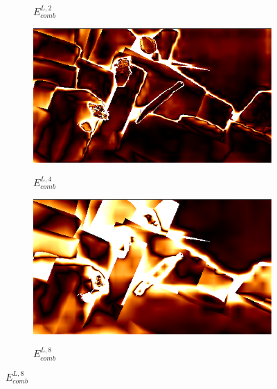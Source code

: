 \documentclass[10pt]{article}
\begin{document}
\begin{figure}[t]
{\begin{subfigure}[b]{0.28\textwidth}
        \vspace{-15pt}      
        \caption{$E_{comb}^{L,2}$}
    \end{subfigure} 
    \hspace{0.001cm} 
    \begin{subfigure}[b]{0.28\textwidth}
        \includegraphics[width=\textwidth]{paper/latex/figures/pred_comb_2_err.png}\\
        \vspace{-15pt}                      
        \caption{$E_{comb}^{L,4}$}
    \end{subfigure} 
    \hspace{0.001cm} 
    \begin{subfigure}[b]{0.28\textwidth}
        \includegraphics[width=\textwidth]{paper/latex/figures/pred_comb_3_err.png}\\
        \vspace{-15pt}     
        \caption{$E_{comb}^{L,8}$}
    \end{subfigure}         
}
\centering
{}
\end{figure}
\end{document}
